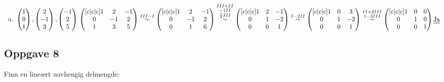 \documentclass{article}
\newcommand{\vect}[1]{\begin{pmatrix} #1 \end{pmatrix}}
\newcommand{\uu}[1]{\underline{\underline{#1}}}
\newcommand{\eqqto}[1]{\overset{\substack{#1}}{\sim}}
\begin{document}
\begin{enumerate}[a)]
\item \(
\vect{1\\0\\1}, \vect{2\\-1\\3}, \vect{-1\\2\\5}
\\\\\\
\begin{pmatrix}[c|c|c]
1&2&-1\\
0&-1&2\\
1&3&5
\end{pmatrix}
\eqqto{III-I}
\begin{pmatrix}[c|c|c]
1&2&-1\\
0&-1&2\\
0&1&6
\end{pmatrix}
\eqqto{III+II\\-1II\\\frac{1}{8}III}
\begin{pmatrix}[c|c|c]
1&2&-1\\
0&1&-2\\
0&0&1
\end{pmatrix}
\eqqto{I-2II}
\begin{pmatrix}[c|c|c]
1&0&3\\
0&1&-2\\
0&0&1
\end{pmatrix}
\eqqto{II+2III\\1-3III}
\begin{pmatrix}[c|c|c]
1&0&0\\
0&1&0\\
0&0&1
\end{pmatrix}
\\\\\\
\text{\uu{Ja}}
\)

\end{enumerate}

\newpage
\subsection*{Oppgave 8}
Finn en lineært uavhengig delmengde:
\end{document}
